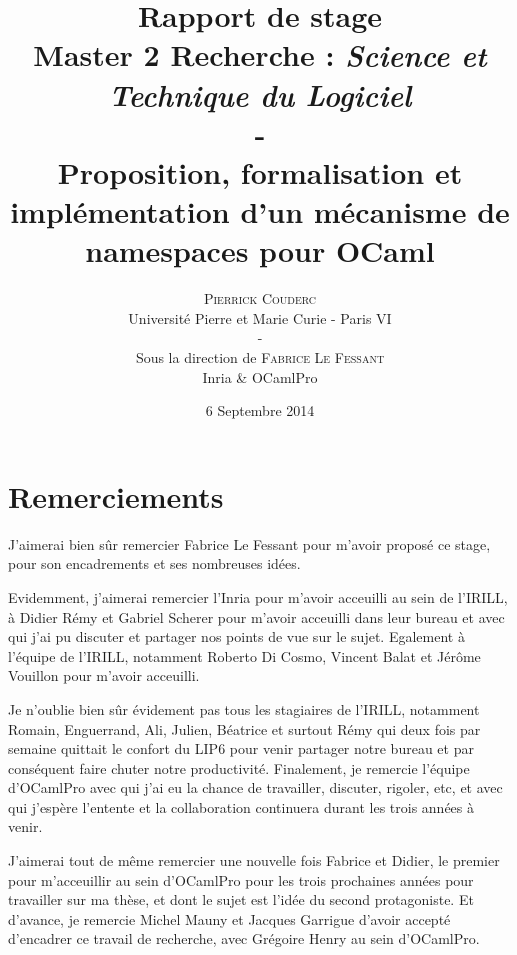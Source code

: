 \documentclass[11pt,a4paper]{report}
\title{
  \textbf{Rapport de stage} \\
  Master 2 Recherche : \emph{Science et Technique du Logiciel}
  \\ - \\
  Proposition, formalisation et implémentation d'un mécanisme de namespaces
  pour OCaml\\ %
}
\author{\textsc{Pierrick Couderc} \\
  Université Pierre et Marie Curie - Paris VI \\ - \\
  Sous la direction de \textsc{Fabrice Le Fessant} \\
  Inria \& OCamlPro
}
\date{6 Septembre 2014}
\begin{document}
\maketitle

\section*{Remerciements}

J'aimerai bien sûr remercier Fabrice Le Fessant pour m'avoir proposé ce stage,
pour son encadrements et ses nombreuses idées.

Evidemment, j'aimerai remercier l'Inria pour m'avoir acceuilli au sein de
l'IRILL, à Didier Rémy et Gabriel Scherer pour m'avoir acceuilli dans leur
bureau et avec qui j'ai pu discuter et partager nos points de vue sur le
sujet. Egalement à l'équipe de l'IRILL, notamment Roberto Di Cosmo, Vincent
Balat et Jérôme Vouillon pour m'avoir acceuilli.

Je n'oublie bien sûr évidement pas tous les stagiaires de l'IRILL, notamment
Romain, Enguerrand, Ali, Julien, Béatrice et surtout Rémy qui deux fois par
semaine quittait le confort du LIP6 pour venir partager notre bureau et par
conséquent faire chuter notre productivité. Finalement, je remercie l'équipe
d'OCamlPro avec qui j'ai eu la chance de travailler, discuter, rigoler, etc, et
avec qui j'espère l'entente et la collaboration continuera durant les trois
années à venir.

J'aimerai tout de même remercier une nouvelle fois Fabrice et Didier, le premier
pour m'acceuillir au sein d'OCamlPro pour les trois prochaines années pour
travailler sur ma thèse, et dont le sujet est l'idée du second protagoniste. Et
d'avance, je remercie Michel Mauny et Jacques Garrigue d'avoir accepté
d'encadrer ce travail de recherche, avec Grégoire Henry au sein d'OCamlPro.
\end{document}
